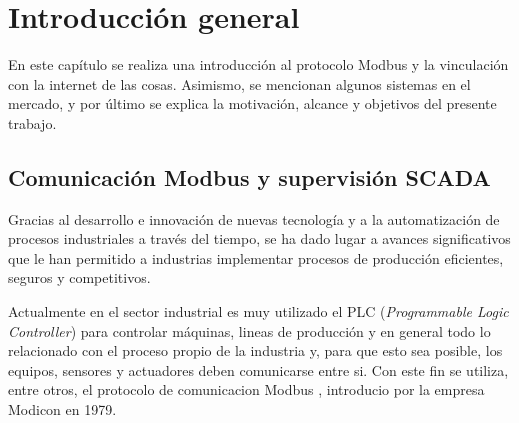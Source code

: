 
\chapter{Introducción general} %

\label{Chapter1} %
\label{IntroGeneral}


\newcommand{\keyword}[1]{\textbf{#1}}
\newcommand{\tabhead}[1]{\textbf{#1}}
\newcommand{\code}[1]{\texttt{#1}}
\newcommand{\file}[1]{\texttt{\bfseries#1}}
\newcommand{\option}[1]{\texttt{\itshape#1}}
\newcommand{\grados}{$^{\circ}$}

En este capítulo se realiza una introducción al protocolo Modbus y la vinculación con la internet de las cosas. Asimismo, se mencionan algunos sistemas en el mercado, y por último se explica la motivación, alcance y objetivos del presente trabajo.




\section{Comunicación Modbus y supervisión SCADA}

Gracias al desarrollo e innovación de nuevas tecnología y a la automatización de procesos industriales a través del tiempo, se ha dado lugar a avances significativos que le han permitido a industrias implementar procesos de producción eficientes, seguros y competitivos.

Actualmente en el sector industrial es muy utilizado el PLC (\textit{Programmable Logic Controller}) \citep{WEBSITE:1} para controlar máquinas, lineas de producción y en general todo lo relacionado con el proceso propio de la industria y, para que esto sea posible, los equipos, sensores y actuadores deben comunicarse entre si. Con este fin se utiliza, entre otros, el protocolo de comunicacion Modbus  \citep{WEBSITE:2}, introducio por la empresa Modicon en 1979. 

